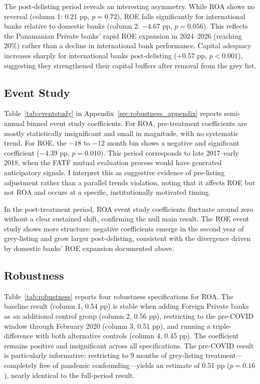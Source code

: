 \documentclass[12pt]{article}
\begin{document}
The post-delisting period reveals an interesting asymmetry. While ROA shows no reversal (column 1: 0.21 pp, $p = 0.72$), ROE falls significantly for international banks relative to domestic banks (column 2: $-4.67$ pp, $p = 0.056$). This reflects the Panamanian Private banks' rapid ROE expansion in 2024--2026 (reaching 20\%) rather than a decline in international bank performance. Capital adequacy increases sharply for international banks post-delisting ($+0.57$ pp, $p < 0.001$), suggesting they strengthened their capital buffers after removal from the grey list.

\subsection{Event Study}

Table~\ref{tab:eventstudy} in Appendix~\ref{sec:robustness_appendix} reports semi-annual binned event study coefficients. For ROA, pre-treatment coefficients are mostly statistically insignificant and small in magnitude, with no systematic trend. For ROE, the $-18$ to $-12$ month bin shows a negative and significant coefficient ($-4.39$ pp, $p = 0.010$). This period corresponds to late 2017--early 2018, when the FATF mutual evaluation process would have generated anticipatory signals. I interpret this as suggestive evidence of pre-listing adjustment rather than a parallel trends violation, noting that it affects ROE but not ROA and occurs at a specific, institutionally motivated timing.

In the post-treatment period, ROA event study coefficients fluctuate around zero without a clear sustained shift, confirming the null main result. The ROE event study shows more structure: negative coefficients emerge in the second year of grey-listing and grow larger post-delisting, consistent with the divergence driven by domestic banks' ROE expansion documented above.

\subsection{Robustness}



Table~\ref{tab:robustness} reports four robustness specifications for ROA. The baseline result (column 1, 0.54 pp) is stable when adding Foreign Private banks as an additional control group (column 2, 0.56 pp), restricting to the pre-COVID window through February 2020 (column 3, 0.51 pp), and running a triple-difference with both alternative controls (column 4, 0.45 pp). The coefficient remains positive and insignificant across all specifications. The pre-COVID result is particularly informative: restricting to 9 months of grey-listing treatment---completely free of pandemic confounding---yields an estimate of 0.51 pp ($p = 0.16$), nearly identical to the full-period result.
\end{document}
